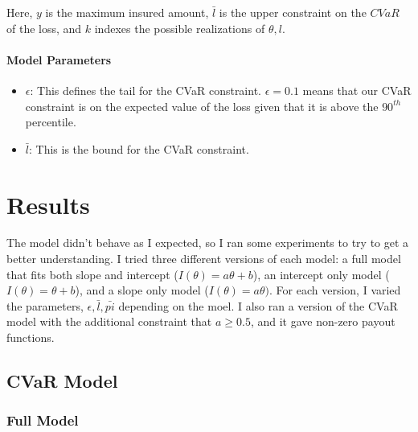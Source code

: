 \documentclass[11pt]{article}
\begin{document}
    Here, $y$ is the maximum insured amount, $\bar{l}$ is the upper constraint on the $CVaR$ of the loss, and $k$ indexes the possible realizations of $\theta, l$.
    \paragraph*{Model Parameters}
    \begin{itemize}
        \item $\epsilon$: This defines the tail for the CVaR constraint. $\epsilon = 0.1$ means that our CVaR constraint is on the expected value of the loss given that it is above the $90^{th}$ percentile. 
        \item $\bar{l}$: This is the bound for the CVaR constraint.
    \end{itemize}

\section{Results}
The model didn't behave as I expected, so I ran some experiments to try to get a better understanding. I tried three different versions of each model: a full model that fits both slope and intercept ($I(\theta) = a\theta +b$), an intercept only model ($I(\theta) = \theta + b$), and a slope only model ($I(\theta) = a\theta)$. For each version, I varied the parameters, $\epsilon, \bar{l}, \bar{pi}$ depending on the moel. I also ran a version of the CVaR model with the additional constraint that $a \geq 0.5$, and it gave non-zero payout functions. 
    \subsection*{CVaR Model}
        \subsubsection*{Full Model}
\end{document}
